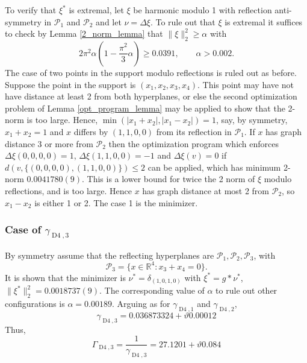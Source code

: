 \documentclass[a4paper, 12pt, notitlepage]{amsart}
\newcommand{\Dfour}{\operatorname{D4}}
\newcommand{\bR}{\mathbb{R}}
\newcommand{\sP}{{\mathscr{P}}}
\theoremstyle{remark}
\begin{document}
To verify that $\xi^*$ is extremal, let $\xi$ be harmonic modulo 1 with reflection anti-symmetry in $\sP_1$ and $\sP_2$ and let $\nu = \Delta \xi$.  To rule out that $\xi$ is extremal it suffices to check by Lemma \ref{2_norm_lemma} that $\|\xi\|_2^2 \geq \alpha$ with 
\begin{equation}
 2\pi^2 \alpha\left(1 - \frac{\pi^2}{3}\alpha \right) \geq 0.0391, \qquad \alpha >0.002. 
\end{equation}
The case of two points in the support modulo reflections is ruled out as before.  Suppose the point in the support is $(x_1, x_2, x_3, x_4)$.  This point may have not have distance at least 2 from both hyperplanes, or else the second optimization problem of Lemma \ref{opt_program_lemma} may be applied to show that the 2-norm is too large.  Hence, $\min(|x_1 + x_2|, |x_1 -x_2|) = 1$, say, by symmetry, $x_1 + x_2 = 1$ and $x$ differs by $(1,1,0,0)$ from its reflection in $\sP_1$.  If $x$ has graph distance 3 or more from $\sP_2$ then the  optimization program which enforces $\Delta \xi (0,0,0,0)= 1$, $\Delta \xi (1,1,0,0) = -1$ and $\Delta \xi(v) = 0$ if $d(v, \{(0,0,0,0), (1,1,0,0)\}) \leq 2$ can be applied, which has minimum 2-norm  $0.0041780(9)$.  This is a lower bound for twice the 2 norm of $\xi$ modulo reflections, and is too large.  Hence $x$ has graph distance at most 2 from $\sP_2$, so $x_1 - x_2$ is either 1 or 2.  The case 1 is the minimizer. 

\subsubsection*{Case of $\gamma_{\Dfour, 3}$}  By symmetry assume that the reflecting hyperplanes are $\sP_1, \sP_2, \sP_3$, with
\begin{equation}
 \sP_3 = \{x \in \bR^4: x_3 + x_4 = 0\}.
\end{equation}
It is shown that the minimizer is $\nu^* = \delta_{(1,0,1,0)}$ with $\xi^* = g*\nu^*$, $\|\xi^*\|_2^2 = 0.0018737(9)$. The corresponding value of $\alpha$ to rule out other configurations is $\alpha = 0.00189$.  Arguing as for $\gamma_{\Dfour, 1}$ and $\gamma_{\Dfour, 2}$,
\begin{equation*}
 \gamma_{\Dfour,3} = 0.036873324 +\vartheta 0.00012
\end{equation*}
Thus,
\begin{equation*}
 \Gamma_{\Dfour,3} = \frac{1}{\gamma_{\Dfour, 3}} = 27.1201 + \vartheta 0.084
\end{equation*}
\end{document}

